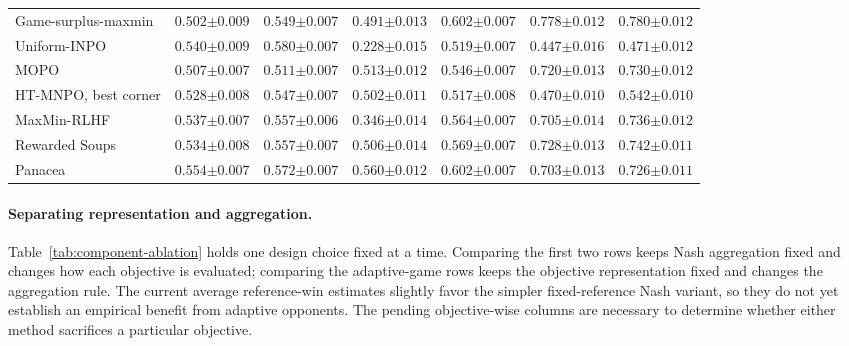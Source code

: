 \documentclass{article}
\theoremstyle{remark}
\theoremstyle{plain}
\begin{document}
\begin{table}[t]
\begin{tabular}{lrrrrrr}
Game-surplus-maxmin & $0.502{\scriptstyle\pm0.009}$ & $0.549{\scriptstyle\pm0.007}$ & $0.491{\scriptstyle\pm0.013}$ & $0.602{\scriptstyle\pm0.007}$ & $0.778{\scriptstyle\pm0.012}$ & $0.780{\scriptstyle\pm0.012}$\\
Uniform-INPO & $0.540{\scriptstyle\pm0.009}$ & $\mathbf{0.580{\scriptstyle\pm0.007}}$ & $0.228{\scriptstyle\pm0.015}$ & $0.519{\scriptstyle\pm0.007}$ & $0.447{\scriptstyle\pm0.016}$ & $0.471{\scriptstyle\pm0.012}$\\
MOPO & $0.507{\scriptstyle\pm0.007}$ & $0.511{\scriptstyle\pm0.007}$ & $0.513{\scriptstyle\pm0.012}$ & $0.546{\scriptstyle\pm0.007}$ & $0.720{\scriptstyle\pm0.013}$ & $0.730{\scriptstyle\pm0.012}$\\
HT-MNPO, best corner & $0.528{\scriptstyle\pm0.008}$ & $0.547{\scriptstyle\pm0.007}$ & $0.502{\scriptstyle\pm0.011}$ & $0.517{\scriptstyle\pm0.008}$ & $0.470{\scriptstyle\pm0.010}$ & $0.542{\scriptstyle\pm0.010}$\\
MaxMin-RLHF & $0.537{\scriptstyle\pm0.007}$ & $0.557{\scriptstyle\pm0.006}$ & $0.346{\scriptstyle\pm0.014}$ & $0.564{\scriptstyle\pm0.007}$ & $0.705{\scriptstyle\pm0.014}$ & $0.736{\scriptstyle\pm0.012}$\\
Rewarded Soups & $0.534{\scriptstyle\pm0.008}$ & $0.557{\scriptstyle\pm0.007}$ & $0.506{\scriptstyle\pm0.014}$ & $0.569{\scriptstyle\pm0.007}$ & $0.728{\scriptstyle\pm0.013}$ & $0.742{\scriptstyle\pm0.011}$\\
Panacea & $\mathbf{0.554{\scriptstyle\pm0.007}}$ & $0.572{\scriptstyle\pm0.007}$ & $\mathbf{0.560{\scriptstyle\pm0.012}}$ & $\mathbf{0.602{\scriptstyle\pm0.007}}$ & $0.703{\scriptstyle\pm0.013}$ & $0.726{\scriptstyle\pm0.011}$\\
\bottomrule
\end{tabular}
\end{table}

\paragraph{Separating representation and aggregation.}
Table~\ref{tab:component-ablation} holds one design choice fixed at a time. Comparing the first two rows keeps Nash aggregation fixed and changes how each objective is evaluated; comparing the adaptive-game rows keeps the objective representation fixed and changes the aggregation rule. The current average reference-win estimates slightly favor the simpler fixed-reference Nash variant, so they do not yet establish an empirical benefit from adaptive opponents. The pending objective-wise columns are necessary to determine whether either method sacrifices a particular objective.
\end{document}
